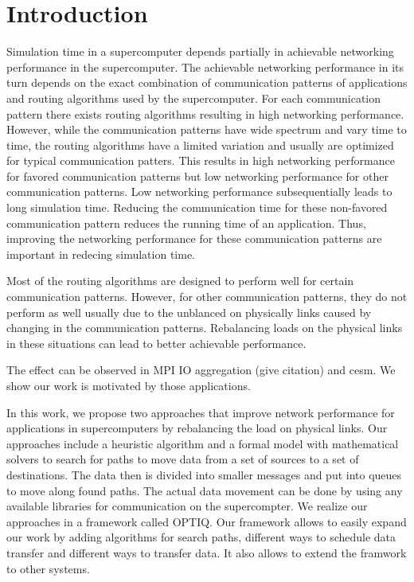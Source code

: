 \section{Introduction}
\label{sec:intro}
Simulation time in a supercomputer depends partially in achievable networking performance in the supercomputer. The achievable networking performance in its turn depends on the exact combination of communication patterns of applications and routing algorithms used by the supercomputer. For each communication pattern there exists routing algorithms resulting in high networking performance. However, while the communication patterns have wide spectrum and vary time to time, the routing algorithms have a limited variation and usually are optimized for typical communication patters. This results in high networking performance for favored communication patterns but low networking performance for other communication patterns. Low networking performance subsequentially leads to long simulation time. Reducing the communication time for these non-favored communication pattern reduces the running time of an application. Thus, improving the networking performance for these communication patterns are important in redecing simulation time. 

Most of the routing algorithms are designed to perform well for certain communication patterns. However, for other communication patterns, they do not perform as well usually due to the unblanced on physically links caused by changing in the communication patterns. Rebalancing loads on the physical links in these situations can lead to better achievable performance. 

The effect can be observed in MPI IO aggregation (give citation) and cesm. We show our work is motivated by those applications.

In this work, we propose two approaches that improve network performance for applications in supercomputers by rebalancing the load on physical links. Our approaches include a heuristic algorithm and a formal model with mathematical solvers to search for paths to move data from a set of sources to a set of destinations. The data then is divided into smaller messages and put into queues to move along found paths. The actual data movement can be done by using any available libraries for communication on the supercompter. We realize our approaches in a framework called OPTIQ. Our framework allows to easily expand our work by adding algorithms for search paths, different ways to schedule data transfer and different ways to transfer data. It also allows to extend the framwork to other systems.

